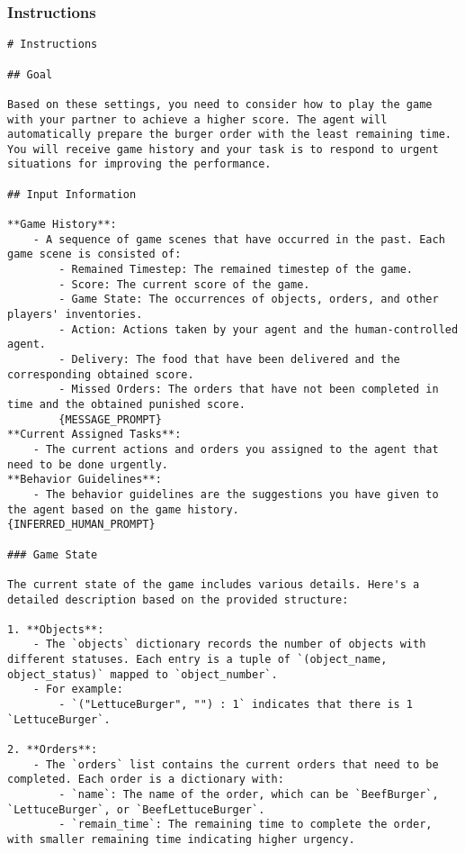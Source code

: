 \subsubsection{Instructions}
\begin{lstlisting}
# Instructions

## Goal

Based on these settings, you need to consider how to play the game with your partner to achieve a higher score. The agent will automatically prepare the burger order with the least remaining time. You will receive game history and your task is to respond to urgent situations for improving the performance.

## Input Information

**Game History**:
    - A sequence of game scenes that have occurred in the past. Each game scene is consisted of:
        - Remained Timestep: The remained timestep of the game.
        - Score: The current score of the game.
        - Game State: The occurrences of objects, orders, and other players' inventories.
        - Action: Actions taken by your agent and the human-controlled agent.
        - Delivery: The food that have been delivered and the corresponding obtained score.
        - Missed Orders: The orders that have not been completed in time and the obtained punished score.
        {MESSAGE_PROMPT}
**Current Assigned Tasks**:
    - The current actions and orders you assigned to the agent that need to be done urgently.
**Behavior Guidelines**:
    - The behavior guidelines are the suggestions you have given to the agent based on the game history.
{INFERRED_HUMAN_PROMPT}

### Game State

The current state of the game includes various details. Here's a detailed description based on the provided structure:

1. **Objects**:
    - The `objects` dictionary records the number of objects with different statuses. Each entry is a tuple of `(object_name, object_status)` mapped to `object_number`.
    - For example:
        - `("LettuceBurger", "") : 1` indicates that there is 1 `LettuceBurger`.

2. **Orders**:
    - The `orders` list contains the current orders that need to be completed. Each order is a dictionary with:
        - `name`: The name of the order, which can be `BeefBurger`, `LettuceBurger`, or `BeefLettuceBurger`.
        - `remain_time`: The remaining time to complete the order, with smaller remaining time indicating higher urgency.


\end{lstlisting}
